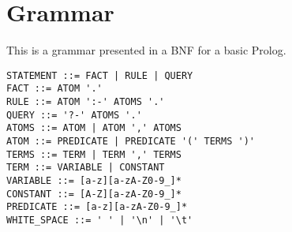 


\section{Grammar}

This is a grammar presented in a BNF for a basic Prolog. 


\begin{lstlisting}
STATEMENT ::= FACT | RULE | QUERY
FACT ::= ATOM '.'
RULE ::= ATOM ':-' ATOMS '.'
QUERY ::= '?-' ATOMS '.'
ATOMS ::= ATOM | ATOM ',' ATOMS
ATOM ::= PREDICATE | PREDICATE '(' TERMS ')'
TERMS ::= TERM | TERM ',' TERMS
TERM ::= VARIABLE | CONSTANT
VARIABLE ::= [a-z][a-zA-Z0-9_]*
CONSTANT ::= [A-Z][a-zA-Z0-9_]*
PREDICATE ::= [a-z][a-zA-Z0-9_]*
WHITE_SPACE ::= ' ' | '\n' | '\t'
\end{lstlisting}
